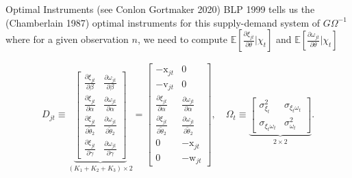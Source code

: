 \documentclass[aspectratio=169,11pt]{beamer}
\begin{document}
\begin{frame}{Optimal Instruments (see Conlon Gortmaker 2020)}
\noindent BLP 1999 tells us the (Chamberlain 1987) optimal instruments for this supply-demand system of $G\Omega^{-1}$ where for a given observation $n$, we need to compute $\mathbb{E}[\frac{\partial \xi_{jt}}{\partial \theta} | \chi_t]$ and $\mathbb{E}[\frac{\partial \omega_{jt}}{\partial \theta} | \chi_t]$

\begin{align*}
    D_{jt} \equiv \underbrace{
        \begin{bmatrix}
            \frac{\partial \xi_{jt}}{\partial \beta}
            & \frac{\partial \omega_{jt}}{\partial \beta} \\
            \frac{\partial \xi_{jt}}{\partial \alpha}
            & \frac{\partial \omega_{jt}}{\partial \alpha} \\
            \frac{\partial \xi_{jt}}{\partial \widetilde{\theta}_2}
            & \frac{\partial \omega_{jt}}{\partial \widetilde{\theta}_2} \\
            \frac{\partial \xi_{jt}}{\partial \gamma} 
            & \frac{\partial \omega_{jt}}{\partial \gamma} 
        \end{bmatrix}
    }_{(K_1 + K_2 + K_3)\times 2}
    = 
    \begin{bmatrix}
        -\mathrm{x}_{jt} & 0 \\
        -\mathrm{v}_{jt} & 0 \\
        \frac{\partial \xi_{jt}}{\partial \alpha}  
        &  \frac{\partial \omega_{jt}}{\partial \alpha}\\
        \frac{\partial \xi_{jt}}{\partial \widetilde{\theta}_2} 
        & \frac{\partial \omega_{jt}}{\partial \widetilde{\theta}_2} \\
        0 & -\mathrm{x}_{jt} \\
        0 & -\mathrm{w}_{jt}
    \end{bmatrix}
    , \quad \Omega_t \equiv 
    \underbrace{
        \begin{bmatrix}
        \sigma^2_{\xi_t} & \sigma_{\xi_t \omega_t}\\
        \sigma_{\xi_t \omega_t} & \sigma^2_{\omega_t}
    \end{bmatrix}
    }_{2 \times 2}.
\end{align*}
\end{frame}
\end{document}
